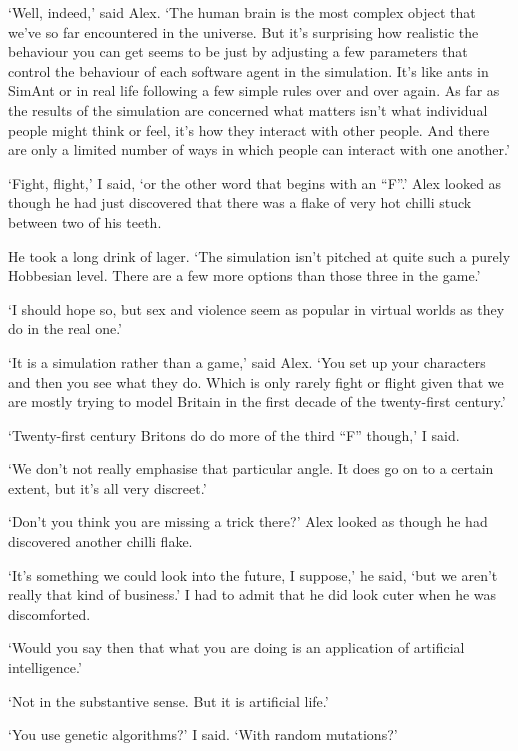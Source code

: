 `Well, indeed,' said Alex. `The human brain is the most complex
object that we've so far encountered in the universe. But it's
surprising how realistic the behaviour you can get seems to be just
by adjusting a few parameters that control the behaviour of each
software agent in the simulation. It's like ants in {\twelvesl SimAnt\/} or in real life following a few simple rules over and over again. As far as the results of the simulation are concerned what matters
isn't what individual people might think or feel, it's how
they interact with other people. And there are only a limited number
of ways in which people can interact with one another.'

`Fight, flight,' I said, `or the other word that begins with an ``F''.' Alex
looked as though he had just discovered that there was a flake of
very hot chilli stuck between two of his teeth.

He took a long drink of lager. `The simulation isn't pitched at
quite such a purely Hobbesian level. There are a few more options
than those three in the game.'

`I should hope so, but sex and violence seem as popular in virtual
worlds as they do in the real one.'

`It is a simulation rather than a game,' said Alex. `You set up your characters
and then you see what they do. Which is only rarely fight or flight
given that we are mostly trying to model Britain in the first decade
of the twenty-first century.'

`Twenty-first century Britons do do more of the third ``F'' though,'
I said.

`We don't not really emphasise that particular angle. It does go on to a certain extent, but it's all very
discreet.'

`Don't you think you are missing a trick there?' Alex looked as
though he had discovered another chilli flake.

`It's something we could look into the future, I suppose,' he said, `but we
aren't really that kind of business.' I had to admit that he did look cuter
when he was discomforted.

`Would you say then that what you are doing is an application of artificial
intelligence.'

`Not in the substantive sense. But it is artificial life.'

`You use genetic algorithms?' I said. `With random mutations?'

